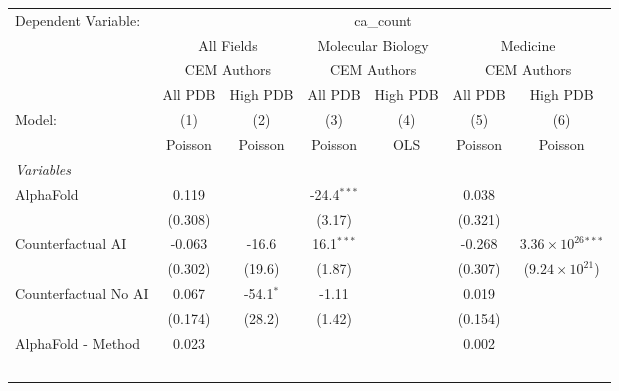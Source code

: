 \begingroup
\centering
\begin{tabular}{lcccccc}
   \tabularnewline \midrule \midrule
   Dependent Variable: & \multicolumn{6}{c}{ca\_count}\\
 & \multicolumn{2}{c}{All Fields} & \multicolumn{2}{c}{Molecular Biology} & \multicolumn{2}{c}{Medicine} \\
\cmidrule(lr){2-3} \cmidrule(lr){4-5} \cmidrule(lr){6-7}
 & \multicolumn{2}{c}{CEM Authors} & \multicolumn{2}{c}{CEM Authors} & \multicolumn{2}{c}{CEM Authors} \\
\cmidrule(lr){2-3} \cmidrule(lr){4-5} \cmidrule(lr){6-7}
 & \multicolumn{1}{c}{All PDB} & \multicolumn{1}{c}{High PDB} & \multicolumn{1}{c}{All PDB} & \multicolumn{1}{c}{High PDB} & \multicolumn{1}{c}{All PDB} & \multicolumn{1}{c}{High PDB} \\
\cmidrule(lr){2-2} \cmidrule(lr){3-3} \cmidrule(lr){4-4} \cmidrule(lr){5-5} \cmidrule(lr){6-6} \cmidrule(lr){7-7}
   Model:                                                     & (1)          & (2)         & (3)           & (4)  & (5)          & (6)\\  
                                                              &  Poisson     & Poisson     & Poisson       & OLS  & Poisson      & Poisson\\  
   \midrule
   \emph{Variables}\\
   AlphaFold                                                  & 0.119        &             & -24.4$^{***}$ &      & 0.038        &   \\   
                                                              & (0.308)      &             & (3.17)        &      & (0.321)      &   \\   
   Counterfactual AI                                          & -0.063       & -16.6       & 16.1$^{***}$  &      & -0.268       & $3.36\times 10^{26}$$^{***}$\\    
                                                              & (0.302)      & (19.6)      & (1.87)        &      & (0.307)      & ($9.24\times 10^{21}$)\\    
   Counterfactual No AI                                       & 0.067        & -54.1$^{*}$ & -1.11         &      & 0.019        &   \\   
                                                              & (0.174)      & (28.2)      & (1.42)        &      & (0.154)      &   \\   
   AlphaFold - Method                                         & 0.023        &             &               &      & 0.002        &   \\   
$$
\end{tabular}
